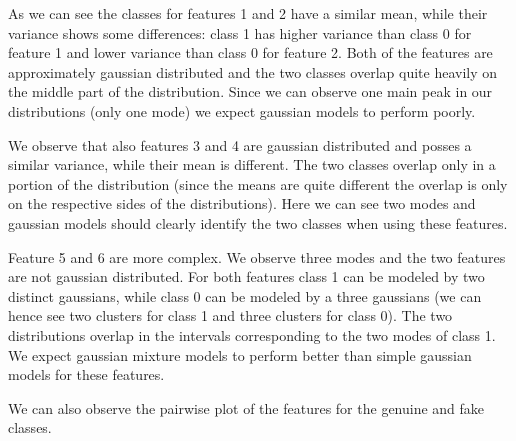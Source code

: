 \documentclass[12pt]{report}
\newcommand{\nnl}{%
    \newline
    \newline
}
\begin{document}
\noindent
As we can see the classes for features 1 and 2 have a similar mean, while their variance shows some differences: class 1 has higher variance than class 0 for feature 1 and lower variance than class 0 for feature 2. Both of the features are approximately gaussian distributed and the two classes overlap quite heavily on the middle part of the distribution. Since we can observe one main peak in our distributions (only one mode) we expect gaussian models to perform poorly.
\nnl
We observe that also features 3 and 4 are gaussian distributed and posses a similar variance, while their mean is different. The two classes overlap only in a portion of the distribution (since the means are quite different the overlap is only on the respective sides of the distributions). Here we can see two modes and gaussian models should clearly identify the two classes when using these features.
\nnl
Feature 5 and 6 are more complex. We observe three modes and the two features are not gaussian distributed. For both features class 1 can be modeled by two distinct gaussians, while class 0 can be modeled by a three gaussians (we can hence see two clusters for class 1 and three clusters for class 0). The two distributions overlap in the intervals corresponding to the two modes of class 1.
We expect gaussian mixture models to perform better than simple gaussian models for these features.
\nnl
We can also observe the pairwise plot of the features for the genuine and fake classes.
\end{document}
